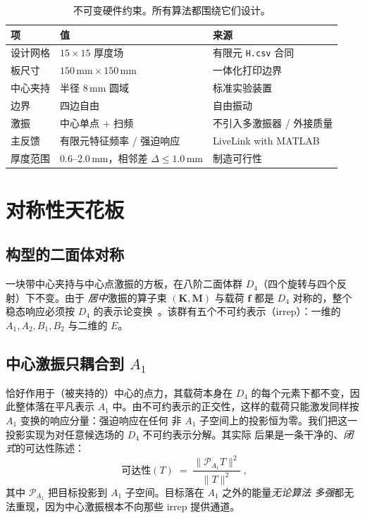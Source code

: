 \documentclass[11pt,a4paper]{article}
\newcommand{\Aone}{A_1}
\newcommand{\Dfour}{D_4}
\newcommand{\matK}{\mathbf{K}}
\newcommand{\matM}{\mathbf{M}}
\begin{document}
\begin{table}[h]
\centering
\caption{不可变硬件约束。所有算法都围绕它们设计。}
\label{tab:contract}
\small
\begin{tabular}{@{}lll@{}}
\toprule
项 & 值 & 来源 \\
\midrule
设计网格   & $15\times15$ 厚度场                 & 有限元 \texttt{H.csv} 合同 \\
板尺寸     & $150\,\text{mm}\times150\,\text{mm}$ & 一体化打印边界 \\
中心夹持   & 半径 $8\,\text{mm}$ 圆域            & 标准实验装置 \\
边界       & 四边自由                            & 自由振动 \\
激振       & 中心单点 + 扫频                     & 不引入多激振器 / 外接质量 \\
主反馈     & 有限元特征频率 / 强迫响应           & LiveLink with MATLAB \\
厚度范围   & $0.6$--$2.0\,\text{mm}$，相邻差 $\Delta\le1.0\,\text{mm}$ & 制造可行性 \\
\bottomrule
\end{tabular}
\end{table}

\section{对称性天花板}\label{sec:theory}

\subsection{构型的二面体对称}
一块带中心夹持与中心点激振的方板，在八阶二面体群 $\Dfour$（四个旋转与四个反射）下不变。由于
\emph{居中}激振的算子束 $(\matK,\matM)$ 与载荷 $\bm{f}$ 都是 $\Dfour$ 对称的，整个稳态响应必须按
$\Dfour$ 的表示论变换~\cite{tinkham1964}。该群有五个不可约表示（irrep）：一维的 $A_1,A_2,B_1,B_2$
与二维的 $E$。

\subsection{中心激振只耦合到 \texorpdfstring{$\Aone$}{A1}}
恰好作用于（被夹持的）中心的点力，其载荷本身在 $\Dfour$ 的每个元素下都不变，因此整体落在平凡表示
$\Aone$ 中。由不可约表示的正交性，这样的载荷只能激发同样按 $\Aone$ 变换的响应分量：强迫响应在任何
非 $\Aone$ 子空间上的投影恒为零。我们把这一投影实现为对任意候选场的 $\Dfour$ 不可约表示分解。其实际
后果是一条干净的、\emph{闭式}的可达性陈述：
\begin{equation}
\boxed{\;\text{可达性}(T)\;=\;\frac{\lVert \mathcal{P}_{\Aone} T\rVert^2}
{\lVert T\rVert^2}\;,}
\label{eq:reach}
\end{equation}
其中 $\mathcal{P}_{\Aone}$ 把目标投影到 $\Aone$ 子空间。目标落在 $\Aone$ 之外的能量\emph{无论算法
多强}都无法重现，因为中心激振根本不向那些 irrep 提供通道。
\end{document}
